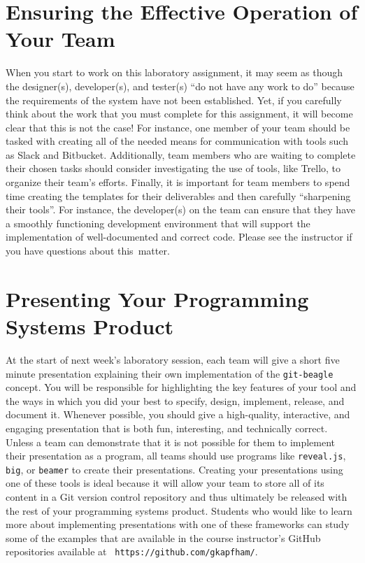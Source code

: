 \section*{Ensuring the Effective Operation of Your Team}

When you start to work on this laboratory assignment, it may seem as though the designer(s), developer(s), and tester(s)
``do not have any work to do'' because the requirements of the system have not been established. Yet, if you carefully
think about the work that you must complete for this assignment, it will become clear that this is not the case! For
instance, one member of your team should be tasked with creating all of the needed means for communication with tools
such as Slack and Bitbucket. Additionally, team members who are waiting to complete their chosen tasks should consider
investigating the use of tools, like Trello, to organize their team's efforts. Finally, it is important for team
members to spend time creating the templates for their deliverables and then carefully ``sharpening their tools''. For
instance, the developer(s) on the team can ensure that they have a smoothly functioning development environment that
will support the implementation of well-documented and correct code. Please see the instructor if you have questions
about \mbox{this matter}.

\section*{Presenting Your Programming Systems Product}

At the start of next week's laboratory session, each team will give a short five minute presentation explaining their
own implementation of the {\tt git-beagle} concept. You will be responsible for highlighting the key features of your
tool and the ways in which you did your best to specify, design, implement, release, and document it. Whenever possible,
you should give a high-quality, interactive, and engaging presentation that is both fun, interesting, and technically
correct. Unless a team can demonstrate that it is not possible for them to implement their presentation as a program,
all teams should use programs like {\tt reveal.js}, {\tt big}, or {\tt beamer} to create their presentations. Creating
your presentations using one of these tools is ideal because it will allow your team to store all of its content in a
Git version control repository and thus ultimately be released with the rest of your programming systems product.
Students who would like to learn more about implementing presentations with one of these frameworks can study some of
the examples that are available in the course instructor's GitHub repositories available at {\tt
https://github.com/gkapfham/}.

